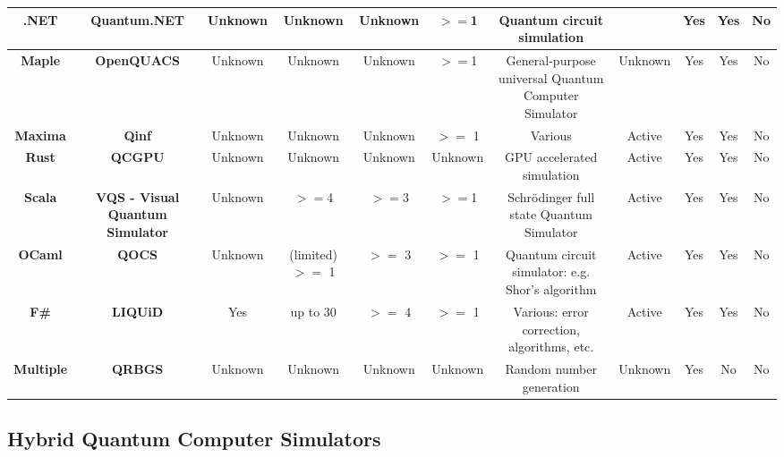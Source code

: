 \documentclass[conference]{IEEEtran}
\begin{document}
\begin{table*}[h!]
{\begin{tabular}{c|c|c|c|c|c|c|c|c|c|c}
	
	
	    
	\multirow{1}{*}{\textbf{.NET}} & \textbf{Quantum.NET } & Unknown & Unknown & Unknown &$>=$1  & Quantum circuit simulation &       & Yes   & Yes   & No \\
	\hline
	
	
    \multirow{1}{*}{\textbf{Maple}} & \textbf{OpenQUACS } & Unknown & Unknown & Unknown &$>=$1  & General-purpose universal Quantum Computer Simulator & Unknown & Yes   & Yes & No \\
	\hline

	
	
    \textbf{Maxima} & \textbf{Qinf } & Unknown & Unknown & Unknown & $>=$ 1   & Various & Active & Yes   & Yes & No \\ \hline
    \textbf{Rust} & \textbf{QCGPU } & Unknown & Unknown & Unknown & Unknown & GPU accelerated simulation & Active & Yes   & Yes   & No \\ \hline
    \textbf{Scala} & \textbf{VQS - Visual Quantum Simulator } & Unknown &$>=$4  &$>=$3  &$>=$1  & Schrödinger full state Quantum Simulator & Active & Yes   & Yes   & No \\ \hline
 	 \textbf{OCaml} & \textbf{QOCS}  & Unknown & (limited) $>=$ 1 & $>=$ 3  & $>=$ 1  & Quantum circuit simulator: e.g. Shor's algorithm & Active & Yes   & Yes   &  No \\ \hline   
	\textbf{F\#} & \textbf{LIQUiD } & Yes   & up to 30 & $>=$ 4  & $>=$ 1  & Various: error correction, algorithms, etc. & Active & Yes   & Yes & No \\ \hline
	\textbf{Multiple} & \textbf{QRBGS } & Unknown & Unknown & Unknown & Unknown & Random number generation & Unknown & Yes   & No & No \\ \hline
	\end{tabular}%
	\label{tab:offline}%
}
\end{table*}%

\vspace{-1em}

\subsection{Hybrid Quantum Computer Simulators}
\end{document}
